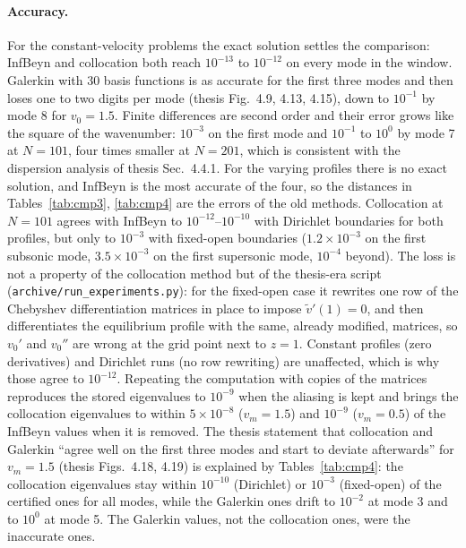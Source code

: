 \documentclass[11pt]{article}
\newcommand{\Real}{\operatorname{Re}}
\newcommand{\Imag}{\operatorname{Im}}
\newcommand{\infbeyn}{InfBeyn}
\begin{document}
\begin{table}[H]
  \centering\small
  
  \caption{Number of eigenvalues in the window $\Real\omega\in[-0.5,26]$, $\Imag\omega\in[-3,3]$ farther
  than $0.1$ from every \infbeyn{} eigenvalue (spurious), per method.}
  \label{tab:spurious}
\end{table}

\paragraph{Accuracy.} For the constant-velocity problems the exact solution settles the comparison:
\infbeyn{} and collocation both reach $10^{-13}$ to $10^{-12}$ on every mode in the window. Galerkin with 30
basis functions is as accurate for the first three modes and then loses one to two digits per mode
(thesis Fig.~4.9, 4.13, 4.15), down to $10^{-1}$ by mode 8 for $v_0=1.5$. Finite differences are second
order and their error grows like the square of the wavenumber: $10^{-3}$ on the first mode and $10^{-1}$ to
$10^{0}$ by mode 7 at $N=101$, four times smaller at $N=201$, which is consistent with the dispersion
analysis of thesis Sec.~4.4.1. For the varying profiles there is no exact solution, and \infbeyn{} is the most
accurate of the four, so the distances in Tables~\ref{tab:cmp3}, \ref{tab:cmp4} are the errors of the old
methods. Collocation at $N=101$ agrees with \infbeyn{} to $10^{-12}$--$10^{-10}$ with Dirichlet boundaries for both
profiles, but only to $10^{-3}$ with fixed-open boundaries ($1.2\times10^{-3}$ on the first subsonic mode,
$3.5\times10^{-3}$ on the first supersonic mode, $10^{-4}$ beyond). The loss is not a property of the collocation method but of the thesis-era script
(\texttt{archive/run\_experiments.py}): for the fixed-open case it rewrites one row of the Chebyshev
differentiation matrices in place to impose $\tilde v'(1)=0$, and then differentiates the equilibrium
profile with the same, already modified, matrices, so $v_0'$ and $v_0''$ are wrong at the grid point next to
$z=1$. Constant profiles (zero derivatives) and Dirichlet runs (no row rewriting) are unaffected, which is why
those agree to $10^{-12}$. Repeating the computation with copies of the matrices reproduces the stored
eigenvalues to $10^{-9}$ when the aliasing is kept and brings the collocation eigenvalues to within
$5\times10^{-8}$ ($v_m=1.5$) and $10^{-9}$ ($v_m=0.5$) of the \infbeyn{} values when it is removed.
The thesis statement that collocation and Galerkin
``agree well on the first three modes and start to deviate afterwards'' for $v_m=1.5$ (thesis Figs.~4.18,
4.19) is explained by Tables~\ref{tab:cmp4}: the collocation eigenvalues stay within $10^{-10}$ (Dirichlet)
or $10^{-3}$ (fixed-open) of the certified ones for all modes, while the Galerkin ones drift to $10^{-2}$
at mode 3 and to $10^{0}$ at mode 5. The Galerkin values, not the collocation ones, were the inaccurate ones.
\end{document}
